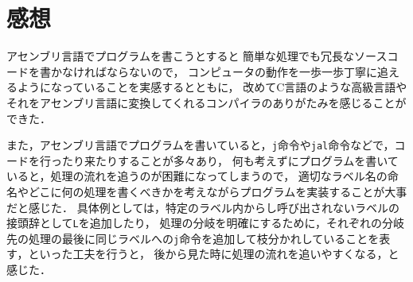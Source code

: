 \documentclass[a4j,11pt]{jarticle}
\begin{document}
\section{感想}
アセンブリ言語でプログラムを書こうとすると
簡単な処理でも冗長なソースコードを書かなければならないので，
コンピュータの動作を一歩一歩丁寧に追えるようになっていることを実感するとともに，
改めてC言語のような高級言語やそれをアセンブリ言語に変換してくれるコンパイラのありがたみを感じることができた．

また，アセンブリ言語でプログラムを書いていると，{\tt j}命令や{\tt jal}命令などで，コードを行ったり来たりすることが多々あり，
何も考えずにプログラムを書いていると，処理の流れを追うのが困難になってしまうので，
適切なラベル名の命名やどこに何の処理を書くべきかを考えながらプログラムを実装することが大事だと感じた．
具体例としては，特定のラベル内からし呼び出されないラベルの接頭辞として{\tt L}を追加したり，
処理の分岐を明確にするために，それぞれの分岐先の処理の最後に同じラベルへの{\tt j}命令を追加して枝分かれしていることを表す，といった工夫を行うと，
後から見た時に処理の流れを追いやすくなる，と感じた．
\end{document}
